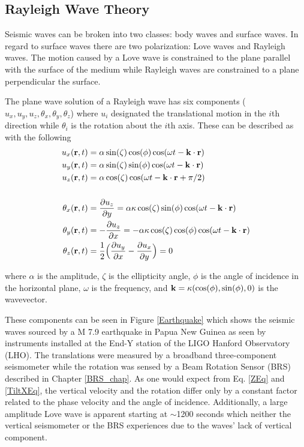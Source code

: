 \documentclass [12pt, proquest]{uwthesis}[2019]
\begin{document}
\subsection{Rayleigh Wave Theory}

Seismic waves can be broken into two classes: body waves and surface waves. In regard to surface waves there are two polarization: Love waves and Rayleigh waves. The motion caused by a Love wave is constrained to the plane parallel with the surface of the medium while Rayleigh waves are constrained to a plane perpendicular the surface. 

The plane wave solution of a Rayleigh wave has six components ($u_x, u_y, u_z, \theta_x, \theta_y, \theta_z$) where $u_i$ designated the translational motion in the $i$th direction while $\theta_i$ is the rotation about the $i$th axis.
These can be described as with the following \cite{seismic}
\begin{align}
u_x({\bf r} ,t)&=\alpha \sin(\zeta) \cos(\phi) \cos(\omega t-{\bf k}\cdot{\bf r})\label{XEq}\\
u_y({\bf r} ,t)&=\alpha \sin(\zeta) \sin(\phi) \cos(\omega t-{\bf k}\cdot{\bf r})\\
u_z({\bf r} ,t)&=\alpha \cos(\zeta) \cos(\omega t-{\bf k}\cdot{\bf r}+\pi/2)\label{ZEq}\\
\notag \\
\theta_x({\bf r} ,t)&=\frac{\partial u_z}{\partial y}=\alpha \kappa \cos(\zeta) \sin(\phi) \cos(\omega t-{\bf k}\cdot{\bf r})\label{TiltXEq}\\
\theta_y({\bf r} ,t)&=-\frac{\partial u_z}{\partial x}=-\alpha \kappa \cos(\zeta) \cos(\phi) \cos(\omega t-{\bf k}\cdot{\bf r})\\
\theta_z({\bf r} ,t)&=\frac{1}{2}\Big(\frac{\partial u_y}{\partial x}-\frac{\partial u_x}{\partial y}\Big)=0
\end{align}

where $\alpha$ is the amplitude, $\zeta$ is the ellipticity angle, $\phi$ is the angle of incidence in the horizontal plane, $\omega$ is the frequency, and $\bf{k}=\kappa (\cos(\phi),\sin(\phi),\text{0})$ is the wavevector.

These components can be seen in Figure \ref{Earthquake} which shows the seismic waves sourced by a M 7.9 earthquake in Papua New Guinea as seen by instruments installed at the End-Y station of the LIGO Hanford Observatory (LHO). The translations were measured by a broadband three-component seismometer while the rotation was sensed by a Beam Rotation Sensor (BRS) described in Chapter \ref{BRS_chap}. As one would expect from Eq. \ref{ZEq} and \ref{TiltXEq}, the vertical velocity and the rotation differ only by a constant factor related to the phase velocity and the angle of incidence. Additionally, a large amplitude Love wave is apparent starting at $\sim$1200 seconds which neither the vertical seismometer or the BRS experiences due to the waves' lack of vertical component.
\end{document}
